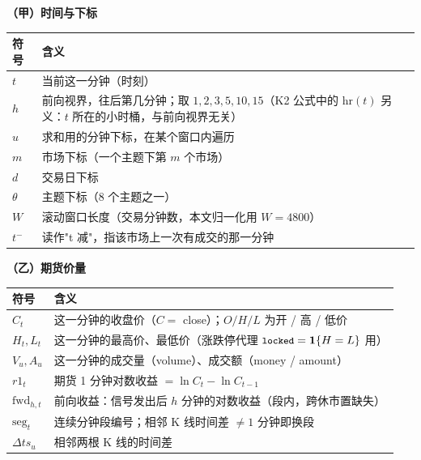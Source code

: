 \smallskip\noindent\textbf{（甲）时间与下标}
\nopagebreak
\begin{center}\footnotesize\setlength{\tabcolsep}{5pt}
\begin{tabular}{lp{11.2cm}}
\toprule
符号 & 含义 \\
\midrule
$t$ & 当前这一分钟（时刻） \\
$h$ & 前向视界，往后第几分钟；取 $1,2,3,5,10,15$（K2 公式中的 $\mathrm{hr}(t)$ 另义：$t$ 所在的小时桶，与前向视界无关） \\
$u$ & 求和用的分钟下标，在某个窗口内遍历 \\
$m$ & 市场下标（一个主题下第 $m$ 个市场） \\
$d$ & 交易日下标 \\
$\theta$ & 主题下标（8 个主题之一） \\
$W$ & 滚动窗口长度（交易分钟数，本文归一化用 $W=4800$） \\
$t^-$ & 读作"t 减"，指该市场上一次有成交的那一分钟 \\
\bottomrule
\end{tabular}
\end{center}

\smallskip\noindent\textbf{（乙）期货价量}
\nopagebreak
\begin{center}\footnotesize\setlength{\tabcolsep}{5pt}
\begin{tabular}{lp{11.2cm}}
\toprule
符号 & 含义 \\
\midrule
$C_t$ & 这一分钟的收盘价（$C=$ close）；$O/H/L$ 为开 / 高 / 低价 \\
$H_t, L_t$ & 这一分钟的最高价、最低价（涨跌停代理 $\texttt{\small locked}=\mathbf{1}\{H=L\}$ 用） \\
$V_u, A_u$ & 这一分钟的成交量（volume）、成交额（money / amount） \\
$r1_t$ & 期货 1 分钟对数收益 $=\ln C_t-\ln C_{t-1}$ \\
$\mathrm{fwd}_{h,t}$ & 前向收益：信号发出后 $h$ 分钟的对数收益（段内，跨休市置缺失） \\
$\mathrm{seg}_t$ & 连续分钟段编号；相邻 K 线时间差 $\ne1$ 分钟即换段 \\
$\Delta ts_u$ & 相邻两根 K 线的时间差 \\
\bottomrule
\end{tabular}
\end{center}

